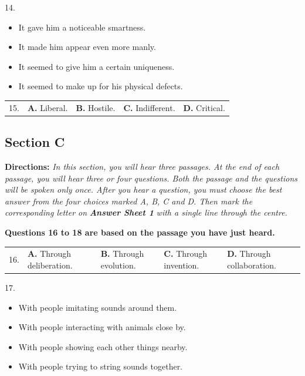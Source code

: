 \documentclass[UTF8,11pt]{ctexart}
\begin{document}
14.


\begin{itemize}[leftmargin=2em,itemsep=.2em,topsep=.4em]\item[A.] It gave him a noticeable smartness.
\item[B.] It made him appear even more manly.
\item[C.] It seemed to give him a certain uniqueness.
\item[D.] It seemed to make up for his physical defects.
\end{itemize}

\noindent\begin{tabularx}{\linewidth}{@{}lXXXX@{}}15. & \textbf{A.} Liberal. & \textbf{B.} Hostile. & \textbf{C.} Indifferent. & \textbf{D.} Critical.\\\end{tabularx}\par

\subsection*{\textbf{Section C}}


\textbf{Directions:}\textit{ In this section, you will hear three passages. At the end of each passage, you will hear three or four} \textit{questions. Both the passage and the questions will be spoken only once. After you hear a question, you must} \textit{choose the best answer from the four choices marked A, B, C and D. Then mark the corresponding letter on} \textbf{\textit{Answer Sheet 1}}\textit{ with a single line through the centre.}


\textbf{Questions 16 to 18 are based on the passage you have just heard.}


\noindent\begin{tabularx}{\linewidth}{@{}lXXXX@{}}16. & \textbf{A.} Through deliberation. & \textbf{B.} Through evolution. & \textbf{C.} Through invention. & \textbf{D.} Through collaboration.\\\end{tabularx}\par

17.


\begin{itemize}[leftmargin=2em,itemsep=.2em,topsep=.4em]\item[A.] With people imitating sounds around them.
\item[B.] With people interacting with animals close by.
\item[C.] With people showing each other things nearby.
\item[D.] With people trying to string sounds together.
\end{itemize}
\end{document}
